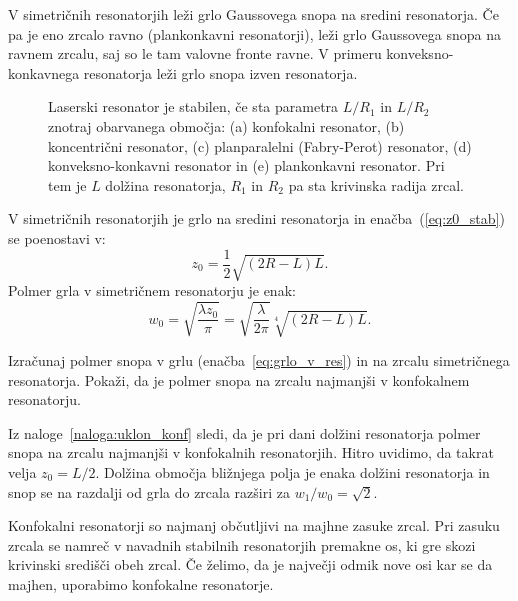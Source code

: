 V simetričnih resonatorjih leži grlo Gaussovega snopa na sredini resonatorja.
Če pa je eno zrcalo ravno (plankonkavni resonatorji), leži grlo Gaussovega snopa 
na ravnem zrcalu, saj so le tam valovne fronte ravne. V primeru konveksno-konkavnega 
resonatorja leži grlo snopa izven resonatorja. 

\begin{figure}[ht]
\centering
\def\svgwidth{95truemm} 

\caption{Laserski resonator je stabilen, 
če sta parametra $L/R_{1}$ in $L/R_{2}$ znotraj obarvanega območja:
(a) konfokalni resonator,
(b) koncentrični resonator, 
(c) planparalelni (Fabry-Perot) resonator, 
(d) konveksno-konkavni resonator 
in (e) plankonkavni resonator. Pri tem je $L$ dolžina resonatorja, $R_1$ in $R_2$ pa sta
krivinska radija zrcal.}
\label{fig:Podrocje-stabilnih-resonatorjev}
\end{figure}

V simetričnih resonatorjih je grlo na sredini resonatorja in enačba~(\ref{eq:z0_stab}) 
se poenostavi v:
\begin{equation}
z_{0}=\frac{1}{2}\sqrt{(2R-L)L}.
\label{eq:zosim}
\end{equation}
Polmer grla v simetričnem resonatorju je enak:
\begin{equation}
w_{0}=\sqrt{\frac{\lambda z_{0}}{\pi}}=\sqrt{\frac{\lambda}{2\pi}}\sqrt[4]{(2R-L)L}.
\label{eq:grlo_v_res}
\end{equation}

\begin{naloga}
\label{naloga:uklon_konf}
 Izračunaj polmer
 snopa v grlu (enačba~\ref{eq:grlo_v_res}) in na zrcalu simetričnega resonatorja. 
 Pokaži, da je polmer snopa na zrcalu najmanjši v konfokalnem resonatorju. 
\end{naloga} 

Iz naloge~\ref{naloga:uklon_konf} sledi, da je pri dani dolžini 
resonatorja polmer snopa na zrcalu najmanjši v konfokalnih 
resonatorjih.  Hitro uvidimo, da takrat 
velja $z_{0}=L/2$. Dolžina območja bližnjega polja je 
enaka dolžini resonatorja in snop se na razdalji od grla do zrcala razširi
za $w_1/w_0=\sqrt{2}$.
\begin{remark}
Konfokalni resonatorji so najmanj občutljivi na majhne zasuke zrcal. 
Pri zasuku zrcala se namreč v navadnih stabilnih resonatorjih premakne os, ki gre skozi 
krivinski središči obeh zrcal. Če želimo, da je največji odmik nove osi kar se da
majhen, uporabimo konfokalne resonatorje. 
\end{remark}


